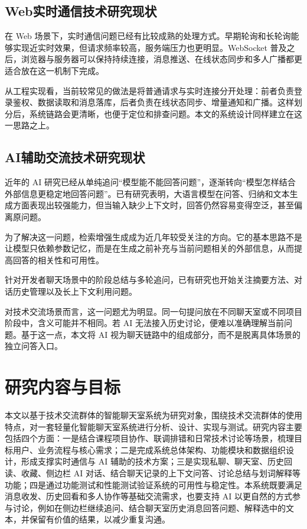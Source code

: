 \subsection{Web实时通信技术研究现状}

在 Web 场景下，实时通信问题已经有比较成熟的处理方式。早期轮询和长轮询能够实现近实时效果，但请求频率较高，服务端压力也更明显。WebSocket 普及之后，浏览器与服务器可以保持持续连接，消息推送、在线状态同步和多人广播都更适合放在这一机制下完成\cite{pollingssews2026}。

从工程实现看，当前较常见的做法是将普通请求与实时连接分开处理：前者负责登录鉴权、数据读取和消息落库，后者负责在线状态同步、增量通知和广播。这样划分后，系统链路会更清晰，也便于定位和排查问题。本文的系统设计同样建立在这一思路之上。

\subsection{AI辅助交流技术研究现状}

近年的 AI 研究已经从单纯追问“模型能不能回答问题”，逐渐转向“模型怎样结合外部信息更稳定地回答问题”。已有研究表明，大语言模型在问答、归纳和文本生成方面表现出较强能力，但当输入缺少上下文时，回答仍然容易变得空泛，甚至偏离原问题\cite{gpt4report2023}。

为了解决这一问题，检索增强生成成为近几年较受关注的方向。它的基本思路不是让模型只依赖参数记忆，而是在生成之前补充与当前问题相关的外部信息，从而提高回答的相关性和可用性\cite{ragsurveycn2025}。

针对开发者聊天场景中的阶段总结与多轮追问，已有研究也开始关注摘要方法、对话历史管理以及长上下文利用问题\cite{devchatsummary2025}。

对技术交流场景而言，这一问题尤为明显。同一句提问放在不同聊天室或不同项目阶段中，含义可能并不相同。若 AI 无法接入历史讨论，便难以准确理解当前问题。基于这一点，本文将 AI 视为聊天链路中的组成部分，而不是脱离具体场景的独立问答入口。

\section{研究内容与目标}

本文以基于技术交流群体的智能聊天室系统为研究对象，围绕技术交流群体的使用特点，对一套轻量化智能聊天室系统进行分析、设计、实现与测试。研究内容主要包括四个方面：一是结合课程项目协作、联调排错和日常技术讨论等场景，梳理目标用户、业务流程与核心需求；二是完成系统总体架构、功能模块和数据组织设计，形成支撑实时通信与 AI 辅助的技术方案；三是实现私聊、聊天室、历史回读、收藏、侧边栏 AI 对话、结合聊天记录的上下文问答、讨论总结与划词解释等功能；四是通过功能测试和性能测试验证系统的可用性与稳定性。本系统既要满足消息收发、历史回看和多人协作等基础交流需求，也要支持 AI 以更自然的方式参与讨论，例如在侧边栏继续追问、结合聊天室历史消息回答问题、解释选中的文本，并保留有价值的结果，以减少重复沟通。

